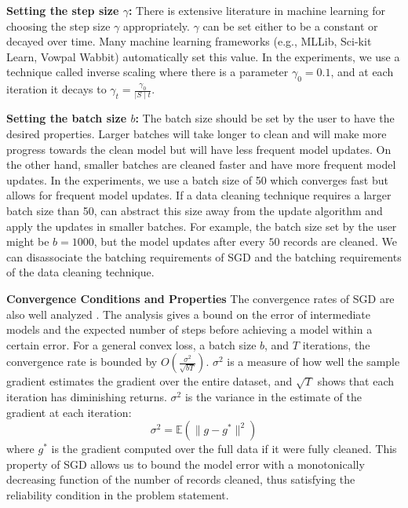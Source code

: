 \vspace{0.25em}

\noindent\textbf{ Setting the step size $\gamma$: } There is extensive literature in machine learning for choosing the step size $\gamma$ appropriately. $\gamma$ can be set either to be a constant or decayed over time. Many machine learning frameworks (e.g., MLLib, Sci-kit Learn, Vowpal Wabbit) automatically set this value. 
In the experiments, we use a technique called inverse scaling where there is a parameter $\gamma_0=0.1$, and at each iteration it decays to $\gamma_t = \frac{\gamma_0}{\mid S \mid t}$. 

\vspace{0.25em}

\noindent\textbf{ Setting the batch size $b$: } The batch size should be set by the user to have the desired properties.
Larger batches will take longer to clean and will make more progress towards the clean model but will have less frequent model updates.
On the other hand, smaller batches are cleaned faster and have more frequent model updates.
In the experiments, we use a batch size of 50 which converges fast but allows for frequent model updates.
If a data cleaning technique requires a larger batch size than 50, \sys can abstract this size away from the update algorithm and apply the updates in smaller batches.
For example, the batch size set by the user might be $b=1000$, but the model updates after every $50$ records are cleaned.
We can disassociate the batching requirements of SGD and the batching requirements of the data cleaning technique.

\vspace{0.25em}

\noindent\textbf{Convergence Conditions and Properties}
The convergence rates of SGD are also well analyzed \cite{dekel2012optimal,bertsekas2011incremental,zhao2014stochastic}. 
The analysis gives a bound on the error of intermediate models and the expected number of steps before achieving a model within a certain error. 
For a general convex loss, a batch size $b$, and $T$ iterations, the convergence rate is bounded by $O(\frac{\sigma^2}{\sqrt{bT}})$. 
$\sigma^2$ is a measure of how well the sample gradient estimates the gradient over the entire dataset, and $\sqrt{T}$ shows that each iteration has diminishing returns.
$\sigma^2$ is the variance in the estimate of the gradient at each iteration:
\[
\sigma^2 = \mathbb{E}(\|g - g^*\|^2)
\]
where $g^*$ is the gradient computed over the full data if it were fully cleaned.
This property of SGD allows us to bound the model error with a monotonically decreasing function of the number of records cleaned, thus satisfying the reliability condition in the problem statement.

